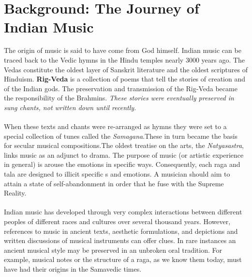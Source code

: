 \documentclass[12pt,a4paper]{article}
\begin{document}
\newpage
\section{Background: The Journey of Indian Music}
The origin of music is said to have come from God himself. Indian music can be traced back to the Vedic hymns in the Hindu temples nearly 3000 years ago. The Vedas  constitute the oldest layer of Sanskrit literature and the oldest scriptures of Hinduism. {\textbf{Rig-Veda}} is a collection of poems that tell the stories of creation and of the Indian gods. The preservation and transmission of the Rig-Veda became the responsibility of the Brahmins. {\em{These stories were eventually preserved in sung chants, not written down until recently.}}
\paragraph{}
When these texts and chants were re-arranged as hymns they were set to a special collection of tunes called the {\em{Samagana}}.These in turn became the basis for secular musical compositions.The oldest treatise on the arts, the {\em{Natyasastra}}, links music as an adjunct to drama. The purpose of music (or artistic experience in general) is arouse the emotions in specific ways. Consequently, each raga and tala are designed to illicit specific 
s and emotions. A musician should aim to attain a state of self-abandonment in order that he fuse with the Supreme Reality. 
\paragraph{}
Indian music has developed through very complex interactions between different peoples of different races and cultures over several thousand years. However, references to music in ancient texts, aesthetic formulations, and depictions and written discussions of musical instruments can offer clues. In rare instances an ancient musical style may be preserved in an unbroken oral tradition. For example, musical notes or the structure of a raga, as we know them today, must have had their origins in the Samavedic times.
\end{document}

